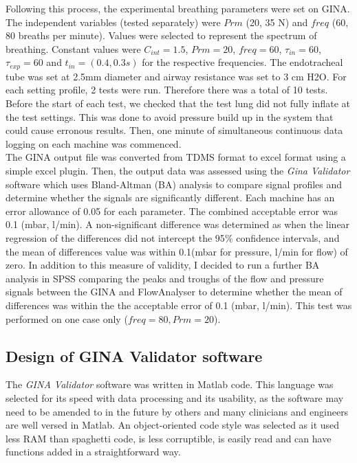 \documentclass[12pt, openany, oneside]{book}
\begin{document}
Following this process, the experimental breathing parameters were set on GINA. The independent variables (tested separately) were $Prm$ (20, 35 N) and $freq$ (60, 80 breaths per minute). Values were selected  to represent the spectrum of breathing. Constant values were $C_{int} = 1.5$, $Prm = 20$, $freq = 60$, $\tau_{in} = 60$, $\tau_{exp} = 60$ and $t_{in} = (0.4, 0.3 s)$ for the respective frequencies. The endotracheal tube was set at 2.5mm diameter and airway resistance was set to 3 cm H2O. For each setting profile, 2 tests were run. Therefore there was a total of 10 tests. Before the start of each test, we checked that the test lung did not fully inflate at the test settings. This was done to avoid pressure build up in the system that could cause erronous results.  Then, one minute of simultaneous continuous data logging on each machine was commenced.\\

The GINA output file was converted from TDMS format to excel format using a simple excel plugin. Then, the output data was assessed using the \textit{Gina Validator} software which uses Bland-Altman (BA) analysis to compare signal profiles and determine whether the signals are significantly different. Each machine has an error allowance of 0.05 for each parameter. The combined acceptable error was 0.1 (mbar, l/min). A non-significant difference was determined as when the linear regression of the differences did not intercept the 95{\%} confidence intervals, and the mean of differences value was within 0.1(mbar for pressure, l/min for flow) of zero.  In addition to this measure of validity, I decided to run a further BA analysis in SPSS comparing the peaks and troughs of the flow and pressure signals between the GINA and FlowAnalyser to determine whether the mean of differences was within the the acceptable error of 0.1  (mbar, l/min). This test was performed on one case only ($freq = 80, Prm = 20$).


\subsection{Design of GINA Validator software}
The \textit{GINA Validator} software was written in Matlab code. This language was selected for its speed with data processing and its usability, as the software may need to be amended to in the future by others and many clinicians and engineers are well versed in Matlab. An object-oriented code style was selected as it used less RAM than spaghetti code, is less corruptible, is easily read and can have functions added in a straightforward way. \\
\end{document}
